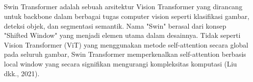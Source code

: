 \subsection{\swin}
\label{subsec:swin}

Swin Transformer adalah sebuah arsitektur Vision Transformer yang
dirancang untuk backbone dalam berbagai tugas computer vision seperti klasifikasi
gambar, deteksi objek, dan segmentasi semantik. Nama "Swin" berasal dari konsep
"Shifted Window" yang menjadi elemen utama dalam desainnya. Tidak seperti
Vision Transformer (ViT) yang menggunakan metode self-attention secara global
pada seluruh gambar, Swin Transformer memperkenalkan self-attention berbasis
local window yang secara signifikan mengurangi kompleksitas komputasi (Liu dkk., 2021).